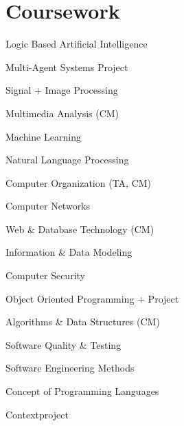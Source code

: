 \documentclass[]{deedy-resume-openfont}
\begin{document}
\begin{minipage}[t]{0.33\textwidth}

\section{Coursework}
\begin{small}
\vspace{0.6\topsep}
\begin{tightemize}
    \item Logic Based Artificial Intelligence
    \item Multi-Agent Systems Project
    \item Signal + Image Processing
    \item Multimedia Analysis (CM)
    \item Machine Learning
    \item Natural Language Processing
\end{tightemize}
\vspace{0.8\topsep}
\end{small}

\begin{small}
\vspace{0.6\topsep}
\begin{tightemize}
    \item Computer Organization (TA, CM)
    \item Computer Networks
\end{tightemize}
\vspace{0.8\topsep}
\end{small}

\begin{small}
\vspace{0.6\topsep}
\begin{tightemize}
    \item Web \& Database Technology (CM)
    \item Information \& Data Modeling
    \item Computer Security
\end{tightemize}
\vspace{0.8\topsep}
\end{small}

\begin{small}
\vspace{0.6\topsep}
\begin{tightemize}
    \item Object Oriented Programming + Project
    \item Algorithms \& Data Structures (CM)
    \item Software Quality \& Testing\
    \item Software Engineering Methods
    \item Concept of Programming Languages
    \item Contextproject
\end{tightemize}
\vspace{0.8\topsep}
\end{small}


\end{minipage}
\end{document}
